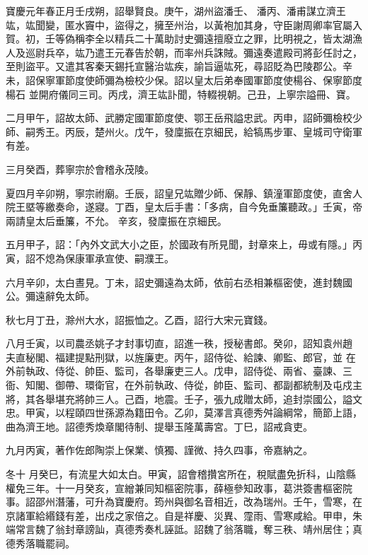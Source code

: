 \begin{pinyinscope}
 寶慶元年春正月壬戌朔，詔舉賢良。庚午，湖州盜潘壬、
 潘丙、潘甫謀立濟王竑，竑聞變，匿水竇中，盜得之，擁至州治，以黃袍加其身，守臣謝周卿率官屬入賀。初，壬等偽稱李全以精兵二十萬助討史彌遠擅廢立之罪，比明視之，皆太湖漁人及巡尉兵卒，竑乃遣王元春告於朝，而率州兵誅賊。彌遠奏遣殿司將彭任討之，至則盜平。又遣其客秦天錫托宣醫治竑疾，諭旨逼竑死，尋詔貶為巴陵郡公。辛未，詔保寧軍節度使師彌為檢校少保。詔以皇太后弟奉國軍節度使楊谷、保寧節度楊石
 並開府儀同三司。丙戌，濟王竑訃聞，特輟視朝。己丑，上寧宗謚冊、寶。



 二月甲午，詔故太師、武勝定國軍節度使、鄂王岳飛謚忠武。丙申，詔師彌檢校少師、嗣秀王。丙辰，楚州火。戊午，發廩振在京細民，給犒馬步軍、皇城司守衛軍有差。



 三月癸酉，葬寧宗於會稽永茂陵。



 夏四月辛卯朔，寧宗祔廟。壬辰，詔皇兄竑贈少師、保靜、鎮潼軍節度使，直舍人院王塈等繳奏命，遂寢。丁酉，皇太后手書：「多病，自今免垂簾聽政。」壬寅，帝兩請皇太后垂簾，不允。
 辛亥，發廩振在京細民。



 五月甲子，詔：「內外文武大小之臣，於國政有所見聞，封章來上，毋或有隱。」丙寅，詔不熄為保康軍承宣使、嗣濮王。



 六月辛卯，太白晝見。丁未，詔史彌遠為太師，依前右丞相兼樞密使，進封魏國公。彌遠辭免太師。



 秋七月丁丑，滁州大水，詔振恤之。乙酉，詔行大宋元寶錢。


八月壬寅，以司農丞姚子才封事切直，詔進一秩，授秘書郎。癸卯，詔知袁州趙
 夫直秘閣、福建提點刑獄，以旌廉吏。丙午，詔侍從、給諫、卿監、郎官，並
 在外前執政、侍從、帥臣、監司，各舉廉吏三人。戊申，詔侍從、兩省、臺諫、三衙、知閣、御帶、環衛官，在外前執政、侍從，帥臣、監司、都副都統制及屯戍主將，其各舉堪充將帥三人。己酉，地震。壬子，張九成贈太師，追封崇國公，謚文忠。甲寅，以程頤四世孫源為籍田令。乙卯，莫澤言真德秀舛論綱常，簡節上語，曲為濟王地。詔德秀煥章閣待制、提舉玉隆萬壽宮。丁巳，詔戒貪吏。



 九月丙寅，著作佐郎陶崇上保業、慎獨、謹微、持久四事，帝嘉納之。



 冬十
 月癸巳，有流星大如太白。甲寅，詔會稽攢宮所在，稅賦盡免折科，山陰縣權免三年。十一月癸亥，宣繒兼同知樞密院事，薛極參知政事，葛洪簽書樞密院事。詔邵州潛藩，可升為寶慶府。筠州與御名音相近，改為瑞州。壬午，雪寒，在京諸軍給緡錢有差，出戍之家倍之。自是祥慶、災異、霪雨、雪寒咸給。甲申，朱端常言魏了翁封章謗訕，真德秀奏札誣詆。詔魏了翁落職，奪三秩、靖州居住；真德秀落職罷祠。




\end{pinyinscope}
